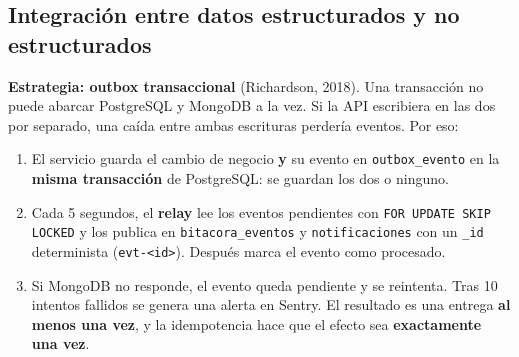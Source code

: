\documentclass[11pt,a4paper]{article}
\begin{document}
\subsection{Integración entre datos estructurados y no estructurados}

\textbf{Estrategia: outbox transaccional} (Richardson, 2018). Una transacción no puede abarcar PostgreSQL y MongoDB a la vez. Si la API escribiera en las dos por separado, una caída entre ambas escrituras perdería eventos. Por eso:

\begin{enumerate}
\item El servicio guarda el cambio de negocio \textbf{y} su evento en \texttt{outbox\_\allowbreak{}evento} en la \textbf{misma transacción} de PostgreSQL: se guardan los dos o ninguno.
\item Cada 5 segundos, el \textbf{relay} lee los eventos pendientes con \texttt{FOR UPDATE SKIP LOCKED} y los publica en \texttt{bitacora\_\allowbreak{}eventos} y \texttt{notificaciones} con un \texttt{\_\allowbreak{}id} determinista (\texttt{evt-{}\allowbreak{}<id>}). Después marca el evento como procesado.
\item Si MongoDB no responde, el evento queda pendiente y se reintenta. Tras 10 intentos fallidos se genera una alerta en Sentry. El resultado es una entrega \textbf{al menos una vez}, y la idempotencia hace que el efecto sea \textbf{exactamente una vez}.
\end{enumerate}
\end{document}

